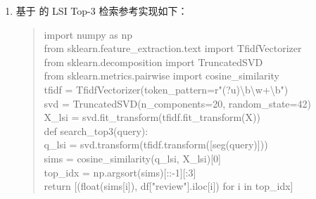 \begin{exercise}[title={中文评论情感分类与 LSI 语义检索综合实践},level=advanced,points=20,tags={jieba,情感分析,TruncatedSVD}]
\begin{solution}
\begin{enumerate}
\begin{quote}
  df = pd.read\_csv("dianping.csv").dropna(subset=["review", "star"])\\
  stopwords = \{"的", "了", "是", "在", "，", "。", "！", "？"\}\\
  def seg(text):\\
  \quad return " ".join(w for w in jieba.lcut(str(text)) if w.strip() and w not in stopwords)\\[4pt]
  X = df["review"].map(seg)\\
  y = (df["star"] > 3).astype(int)\\
  X\_tr, X\_te, y\_tr, y\_te = train\_test\_split(X, y, test\_size=0.2, stratify=y, random\_state=42)\\[4pt]
  clf = make\_pipeline(\\
  \quad CountVectorizer(token\_pattern=r"(?u)\textbackslash b\textbackslash w+\textbackslash b"),\\
  \quad MultinomialNB(alpha=1.0)\\
  )\\
  clf.fit(X\_tr, y\_tr)\\
  y\_pred = clf.predict(X\_te)\\
  print("Acc:", accuracy\_score(y\_te, y\_pred), "Macro-F1:", f1\_score(y\_te, y\_pred, average="macro"))
  \end{quote}
  \item 基于  的 LSI Top-3 检索参考实现如下：
  \begin{quote}\ttfamily\small
  import numpy as np\\
  from sklearn.feature\_extraction.text import TfidfVectorizer\\
  from sklearn.decomposition import TruncatedSVD\\
  from sklearn.metrics.pairwise import cosine\_similarity\\[4pt]
  tfidf = TfidfVectorizer(token\_pattern=r"(?u)\textbackslash b\textbackslash w+\textbackslash b")\\
  svd = TruncatedSVD(n\_components=20, random\_state=42)\\
  X\_lsi = svd.fit\_transform(tfidf.fit\_transform(X))\\[4pt]
  def search\_top3(query):\\
  \quad q\_lsi = svd.transform(tfidf.transform([seg(query)]))\\
  \quad sims = cosine\_similarity(q\_lsi, X\_lsi)[0]\\
  \quad top\_idx = np.argsort(sims)[::-1][:3]\\
  \quad return [(float(sims[i]), df["review"].iloc[i]) for i in top\_idx]
  \end{quote}
\end{enumerate}
\end{solution}
\end{exercise}
